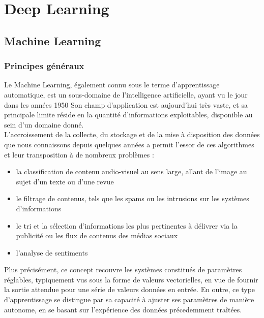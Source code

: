 \documentclass[a4paper,10pt]{report}
\title{}
\author{}
\begin{document}
\maketitle

\chapter{Deep Learning}

\section{Machine Learning}

\subsection{Principes généraux}

Le Machine Learning, également connu sous le terme d'apprentissage automatique, est un sous-domaine de l'intelligence artificielle, ayant vu le jour dans
les années 1950\cite{Bib_Marr}\cite{Bib_McCar}
Son champ d'application est aujourd'hui très vaste, et sa principale limite réside en la quantité d'informations exploitables, disponible au sein d'un domaine donné.
\\

L'accroissement de la collecte, du stockage et de la mise à disposition des données que nous connaissons depuis quelques années a permit l'essor de ces algorithmes et leur transposition à de nombreux problèmes :

\begin{itemize}
  \item la classification de contenu audio-visuel au sens large, allant de l'image au sujet d'un texte ou d'une revue
  \item le filtrage de contenus, tels que les spams ou les intrusions sur les systèmes d'informations
  \item le tri et la sélection d'informations les plus pertinentes à délivrer via la publicité ou les flux de contenus des médias sociaux
  \item l'analyse de sentiments
\end{itemize}

Plus précisément, ce concept recouvre les systèmes constitués de paramètres réglables, typiquement vus sous la forme de
valeurs vectorielles, en vue de fournir la sortie attendue pour une série de valeurs données en entrée. En outre, ce type d'apprentissage se distingue
par sa capacité à ajuster ses paramètres de manière autonome, en se basant sur l'expérience des données précedemment traîtées.
\end{document}
